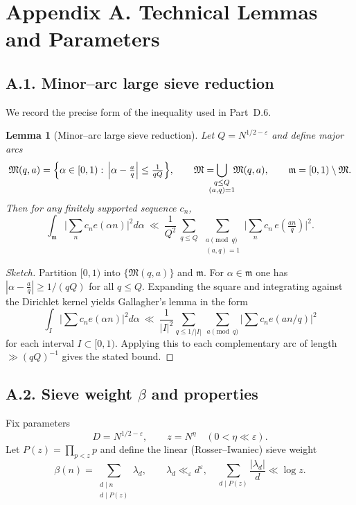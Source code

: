 \documentclass[11pt]{article}
\newtheorem{lemma}{Lemma}[section]
\theoremstyle{definition}
\theoremstyle{remark}
\begin{document}
\section*{Appendix A. Technical Lemmas and Parameters}

\subsection*{A.1. Minor--arc large sieve reduction}

We record the precise form of the inequality used in Part~D.6.

\begin{lemma}[Minor--arc large sieve reduction]\label{lem:largesieve-minor}
Let $Q=N^{1/2-\varepsilon}$ and define major arcs
\[
\mathfrak M(q,a)=\Bigl\{\alpha\in[0,1):\,\Big|\alpha-\tfrac{a}{q}\Big|\le \tfrac{1}{qQ}\Bigr\},
\qquad \mathfrak M=\!\!\!\!\!\bigcup_{\substack{q\le Q\\ (a,q)=1}}\!\!\mathfrak M(q,a),
\qquad \mathfrak m=[0,1)\setminus\mathfrak M.
\]
Then for any finitely supported sequence $c_n$,
\[
\int_{\mathfrak m}\Big|\sum_{n}c_n e(\alpha n)\Big|^2 d\alpha
\ \ll\ \frac{1}{Q^2}\,
\sum_{q\le Q}\ \sum_{\substack{a\!\!\!\pmod q\\ (a,q)=1}}
\Big|\sum_{n} c_n\,e\!\left(\tfrac{an}{q}\right)\Big|^2.
\]
\end{lemma}

\begin{proof}[Sketch]
Partition $[0,1)$ into $\{\mathfrak M(q,a)\}$ and $\mathfrak m$. For $\alpha\in\mathfrak m$ one has
$|\alpha-\tfrac aq|\ge 1/(qQ)$ for all $q\le Q$. Expanding the square and integrating against the Dirichlet kernel yields Gallagher’s lemma in the form
\[
\int_{I} \Big|\sum c_n e(\alpha n)\Big|^2 d\alpha
\ \ll\ \frac{1}{|I|^2}\sum_{q\le 1/|I|}\ \sum_{a\pmod q}\Big|\sum c_n e(an/q)\Big|^2
\]
for each interval $I\subset[0,1)$. Applying this to each complementary arc of length $\gg (qQ)^{-1}$ gives the stated bound. 
\end{proof}

\subsection*{A.2. Sieve weight $\beta$ and properties}

Fix parameters
\[
D=N^{1/2-\varepsilon},\qquad z=N^{\eta}\quad(0<\eta\ll \varepsilon).
\]
Let $P(z)=\prod_{p<z}p$ and define the linear (Rosser--Iwaniec) sieve weight
\[
\beta(n)=\sum_{\substack{d\mid n\\ d\mid P(z)}} \lambda_d,\qquad 
\lambda_d\ll_\varepsilon d^{\varepsilon},\quad
\sum_{d\mid P(z)}\frac{|\lambda_d|}{d}\ll \log z.
\]
\end{document}
